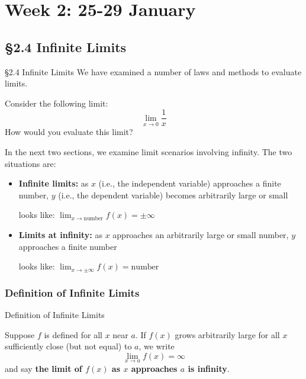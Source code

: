 \documentclass[Cal1Spr16Lectures.tex]{subfiles}
\begin{document}
\section[Week 2]{Week 2: 25-29 January}

\subsection[2.4 Infinite Limits]{\S 2.4 Infinite Limits}

\begin{frame}{\S 2.4 Infinite Limits}
We have examined a number of laws and methods to evaluate limits.  
\begin{que}
Consider the following limit: 
\[
\lim_{x\to 0}\frac{1}{x}
\]
How would you evaluate this limit?
\end{que}
\end{frame}

\begin{frame}{}\footnotesize
In the next two sections, we examine limit scenarios involving infinity.  The two situations are:
\begin{itemize}
\item {\bf Infinite limits:}  as $x$ (i.e., the independent variable) approaches a finite number, $y$ (i.e., the dependent variable) becomes arbitrarily large or small

\vspace{0.5pc}
\hspace{50pt}looks like: $\displaystyle\lim_{x\to\text{number}}f(x)=\pm\infty$
\item {\bf Limits at infinity:} as $x$ approaches an arbitrarily large or small number, $y$ approaches a finite number

\vspace{0.5pc}
\hspace{50pt}looks like: $\displaystyle\lim_{x\to\pm\infty}f(x)=\text{number}$
\end{itemize}
\end{frame}

\subsubsection{Definition of Infinite Limits}
\begin{frame}{\small Definition of Infinite Limits}
\begin{dfn} Suppose $f$ is defined for all $x$ near $a$.  If $f(x)$ grows arbitrarily large for all $x$ sufficiently close (but not equal) to $a$, we write
\[\lim_{x \to a} f(x) = \infty\]
and say {\bf the limit of $f(x)$ as $x$ approaches $a$ is infinity}. \end{dfn}
\end{frame}
\end{document}
